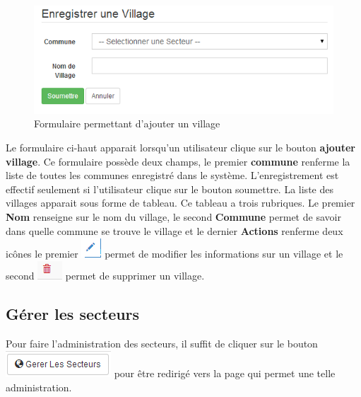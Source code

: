 \documentclass[12pt,a4paper]{report}
\begin{document}
\begin{figure}[h]
\begin{center}
\includegraphics[width=14cm]{pic/FormAddVillage.png}
\end{center}
\caption{Formulaire permettant d'ajouter un village}
\label{Formulaire permettant d'ajouter un village}
\end{figure}

Le formulaire ci-haut apparait lorsqu'un utilisateur clique sur le bouton \textbf{ajouter village}. Ce formulaire possède deux champs, le premier \textbf{commune} renferme la liste de toutes les communes enregistré dans le système. 
L'enregistrement est effectif seulement si l'utilisateur clique sur le bouton soumettre. La liste des villages apparait sous forme de tableau. Ce tableau a trois rubriques. Le premier \textbf{Nom} renseigne sur le nom du village, le second \textbf{Commune} permet de savoir dans quelle commune se trouve le village et le dernier \textbf{Actions} renferme deux icônes le premier \includegraphics[scale=0.7]{pic/EditUser.png}  permet de modifier les informations sur un village et le second \includegraphics[scale=0.7]{pic/DeleteWRed.png}  permet de supprimer un village.

\subsection{Gérer les secteurs}
Pour faire l'administration des secteurs, il suffit de cliquer sur le bouton \includegraphics[scale=0.7]{pic/AdminSecteur.png} pour être redirigé vers la page qui permet une telle administration.
\end{document}
